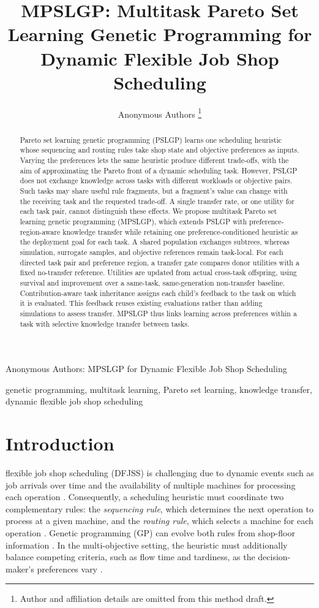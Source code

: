 \documentclass[10pt,journal]{IEEEtran}
\title{MPSLGP: Multitask Pareto Set Learning Genetic Programming for Dynamic Flexible Job Shop Scheduling}
\author{Anonymous Authors%
\thanks{Author and affiliation details are omitted from this method draft.}%
}
\begin{document}
\raggedbottom
{}%
{Anonymous Authors: MPSLGP for Dynamic Flexible Job Shop Scheduling}
\maketitle

\begin{abstract}
Pareto set learning genetic programming (PSLGP) learns one scheduling heuristic whose sequencing and routing rules take shop state and objective preferences as inputs. Varying the preferences lets the same heuristic produce different trade-offs, with the aim of approximating the Pareto front of a dynamic scheduling task. However, PSLGP does not exchange knowledge across tasks with different workloads or objective pairs. Such tasks may share useful rule fragments, but a fragment's value can change with the receiving task and the requested trade-off. A single transfer rate, or one utility for each task pair, cannot distinguish these effects. We propose multitask Pareto set learning genetic programming (MPSLGP), which extends PSLGP with preference-region-aware knowledge transfer while retaining one preference-conditioned heuristic as the deployment goal for each task. A shared population exchanges subtrees, whereas simulation, surrogate samples, and objective references remain task-local. For each directed task pair and preference region, a transfer gate compares donor utilities with a fixed no-transfer reference. Utilities are updated from actual cross-task offspring, using survival and improvement over a same-task, same-generation non-transfer baseline. Contribution-aware task inheritance assigns each child's feedback to the task on which it is evaluated. This feedback reuses existing evaluations rather than adding simulations to assess transfer. MPSLGP thus links learning across preferences within a task with selective knowledge transfer between tasks.
\end{abstract}

\begin{IEEEkeywords}
genetic programming, multitask learning, Pareto set learning, knowledge transfer, dynamic flexible job shop scheduling
\end{IEEEkeywords}

\section{Introduction}
 flexible job shop scheduling (DFJSS) is challenging due to dynamic events such as job arrivals over time and the availability of multiple machines for processing each operation \cite{xu2025learn}. Consequently, a scheduling heuristic must coordinate two complementary rules: the \emph{sequencing rule}, which determines the next operation to process at a given machine, and the \emph{routing rule}, which selects a machine for each operation \cite{xu2026evospeak}. Genetic programming (GP) can evolve both rules from shop-floor information \cite{xu2023genetic}. In the multi-objective setting, the heuristic must additionally balance competing criteria, such as flow time and tardiness, as the decision-maker's preferences vary \cite{li2025multi}.
\end{document}
